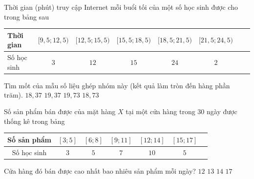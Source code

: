\begin{ex}%
	Thời gian (phút) truy cập Internet mỗi buổi tối  của một số học sinh được cho trong bảng sau
	\begin{center}
		\begin{tabular}{|l|c|c|c|c|c|c|c|}
			\hline Thời gian & {$[9{,}5;12{,}5)$} & {$ [12{,}5;15{,}5)$} & {$[15{,}5;18{,}5) $} & {$[18{,}5;21{,}5)$}  & {$[21{,}5;24{,}5)$}\\
			\hline Số học sinh & $3$ & $12$ & $15$ & $24$& $2$\\ 
			\hline 
		\end{tabular}
	\end{center}
	Tìm mốt  của mẫu số liệu ghép nhóm này (kết quả làm tròn đến hàng phần trăm).
	\choice 
		{ $18{,}37$} 
		 { $19{,}37$}
		{ \True $19{,}73$} 
		 { $18{,}73$}
\end{ex}

\begin{ex}%
	Số  sản phẩm bán được của mặt hàng $X$ tại một cửa hàng trong $30$ ngày được thống kê trong bảng
	\begin{center}
		\begin{tabular}{|c|c|c|c|c|c|c|}
			 \hline
			Số sản phẩm & $[3;5]$ & $[6;8]$ & $[9;11]$ & $[12;14]$ & $[15;17]$  \\
			\hline 
			Số học sinh & $3$ & $5$ &  $7$ & $10$ & $5$\\
			\hline 
		\end{tabular}
	\end{center}
	Cửa hàng đó bán được cao nhất  bao nhiêu sản phẩm mỗi ngày?
	\choice 
		 {\True $12$}
		{$13$} 
		 {$14$}
		 {$17$}
\end{ex}

